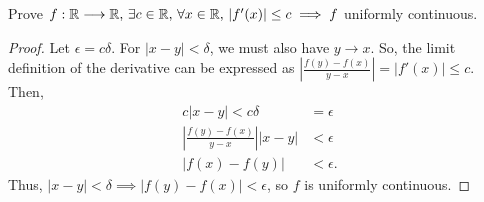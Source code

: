 \documentclass[../hw4]{subfiles}
\begin{document}
\begin{problem}[1]
Prove $f:\mathbb{R}\longrightarrow\mathbb{R},\, \exists c\in \mathbb{R},\, \forall x \in \mathbb{R},\, |f'(x)|\le c\implies f$ uniformly continuous.
\end{problem}
\begin{proof}
	Let $\epsilon=c \delta$. For  $|x-y|<\delta$, we must also have $y\to x$. So, the limit definition of the derivative can be expressed as $\left|\frac{f(y)-f(x)}{y-x}\right| = |f'(x)|\le c$.
	Then, \begin{align*}
		c|x-y|< c\delta                          & = \epsilon \\
		\left|\frac{f(y)-f(x)}{y-x}\right| |x-y| & < \epsilon \\
		|f(x)-f(y)|                              & <\epsilon
		.\end{align*}
	Thus, $|x-y|<\delta\implies|f(y)-f(x)|<\epsilon$, so $f$ is uniformly continuous.
\end{proof}
\end{document}
